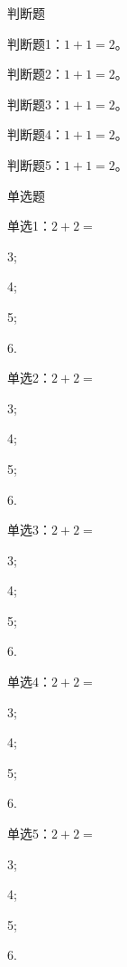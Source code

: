 \begin{makepart}{判断题}
\begin{problem}[2]
  判断题1：$1+1=2$。\true
\end{problem}
\begin{problem}[2]
  判断题2：$1+1=2$。\true
\end{problem}
\begin{problem}[2]
  判断题3：$1+1=2$。\true
\end{problem}
\begin{problem}[2]
  判断题4：$1+1=2$。\true
\end{problem}
\begin{problem}[2]
  判断题5：$1+1=2$。\true
\end{problem}
\end{makepart}

\begin{makepart}{单选题}
\begin{problem}[2]
  单选1：$2+2=$
\begin{abcd}
 \item 3;
 \item 4;
 \item 5;
 \item 6.
\end{abcd}
\end{problem}
\begin{problem}[2]
  单选2：$2+2=$
\begin{abcd}
 \item 3;
 \item 4;
 \item 5;
 \item 6.
\end{abcd}
\end{problem}
\begin{problem}[2]
  单选3：$2+2=$
\begin{abcd}
 \item 3;
 \item 4;
 \item 5;
 \item 6.
\end{abcd}
\end{problem}
\begin{problem}[2]
  单选4：$2+2=$
\begin{abcd}
 \item 3;
 \item 4;
 \item 5;
 \item 6.
\end{abcd}
\end{problem}
\begin{problem}[2]
  单选5：$2+2=$
\begin{abcd}
 \item 3;
 \item 4;
 \item 5;
 \item 6.
\end{abcd}
\end{problem}
\end{makepart}

